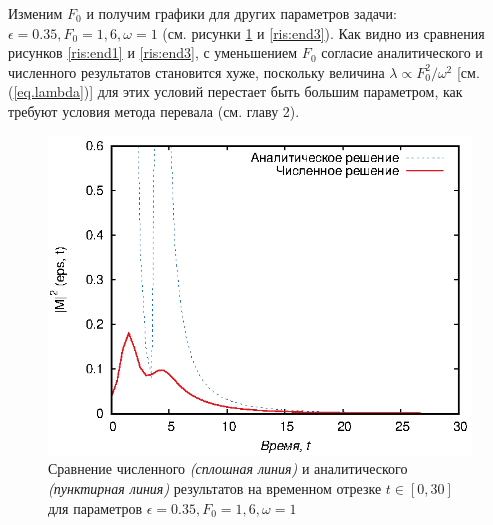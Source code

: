 \documentclass[14pt, a4paper]{article}
\numberwithin{figure}{section}
\numberwithin{equation}{section}
\begin{document}
Изменим $F_0$ и получим графики для других параметров задачи: $\epsilon = 0.35, F_0 = 1,6, \omega = 1$ (см. рисунки \ref{ris:full3} и \ref{ris:end3}). Как видно из сравнения рисунков \ref{ris:end1} и \ref{ris:end3}, с уменьшением $F_0$ согласие аналитического и численного результатов становится хуже, поскольку величина $\lambda\propto F_0^2/\omega^2$ [см. (\ref{eq.lambda})] для этих условий перестает быть большим параметром, как требуют условия метода перевала (см. главу 2). 

\begin{figure}[h]
	\begin{center}
		\includegraphics[width=1\linewidth]{full3}
		\caption{Сравнение численного \textit{(сплошная линия)} и аналитического \textit{(пунктирная линия)} результатов на временном отрезке $t\in[0, 30]$ для параметров $\epsilon = 0.35, F_0 = 1,6, \omega = 1$} %
		\label{ris:full3} %
	\end{center}
\end{figure}
\end{document}
